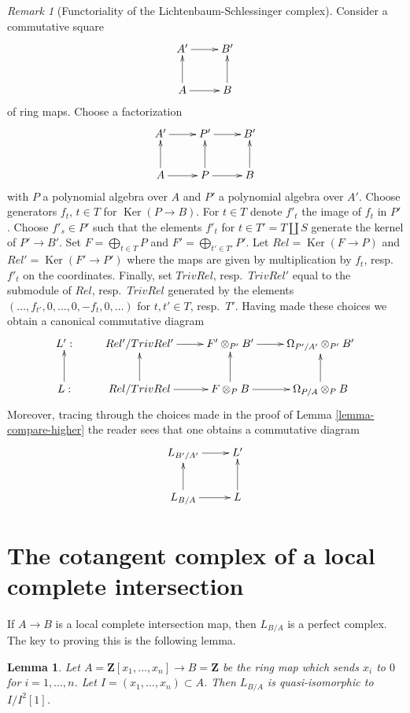 \documentclass{stacks-project}
\theoremstyle{plain}
\newtheorem{lemma}[subsection]{Lemma}
\theoremstyle{definition}
\theoremstyle{remark}
\newtheorem{remark}[subsection]{Remark}
\numberwithin{equation}{subsection}
\def\Ker{\mathop{\mathrm{Ker}}}
\begin{document}
\begin{remark}[Functoriality of the Lichtenbaum-Schlessinger complex]
\label{remark-functoriality-lichtenbaum-schlessinger}
Consider a commutative square
$$
\xymatrix{
A' \ar[r] & B' \\
A \ar[u] \ar[r] & B \ar[u]
}
$$
of ring maps. Choose a factorization
$$
\xymatrix{
A' \ar[r] & P' \ar[r] & B' \\
A \ar[u] \ar[r] & P \ar[u] \ar[r] & B \ar[u]
}
$$
with $P$ a polynomial algebra over $A$ and $P'$ a polynomial algebra over $A'$.
Choose generators $f_t$, $t \in T$ for $\Ker(P \to B)$.
For $t \in T$ denote $f'_t$ the image of $f_t$ in $P'$.
Choose $f'_s \in P'$ such that the elements $f'_t$ for
$t \in T' = T \amalg S$ generate the kernel
of $P' \to B'$. Set $F = \bigoplus_{t \in T} P$ and
$F' = \bigoplus_{t' \in T'} P'$. Let $Rel = \Ker(F \to P)$
and $Rel' = \Ker(F' \to P')$ where the maps are given
by multiplication by $f_t$, resp.\ $f'_t$ on the coordinates.
Finally, set $TrivRel$, resp.\ $TrivRel'$ equal to the submodule
of $Rel$, resp.\ $TrivRel$ generated by the elements
$(\ldots, f_{t'}, 0, \ldots, 0, -f_t, 0, \ldots)$
for $t, t' \in T$, resp.\ $T'$. Having made these choices we obtain a
canonical commutative diagram
$$
\xymatrix{
L' : &
Rel'/TrivRel' \ar[r] &
F' \otimes_{P'} B' \ar[r] &
\Omega_{P'/A'} \otimes_{P'} B' \\
L : \ar[u] &
Rel/TrivRel \ar[r] \ar[u] &
F \otimes_P B \ar[r] \ar[u] &
\Omega_{P/A} \otimes_P B \ar[u]
}
$$
Moreover, tracing through the choices made in the proof of
Lemma \ref{lemma-compare-higher}
the reader sees that one obtains a commutative diagram
$$
\xymatrix{
L_{B'/A'} \ar[r] & L' \\
L_{B/A} \ar[r] \ar[u] & L \ar[u]
}
$$
\end{remark}





\section{The cotangent complex of a local complete intersection}
\label{section-lci}

\noindent
If $A \to B$ is a local complete intersection map, then
$L_{B/A}$ is a perfect complex. The key to proving this is
the following lemma.

\begin{lemma}
\label{lemma-special-case}
Let $A = \mathbf{Z}[x_1, \ldots, x_n] \to B = \mathbf{Z}$
be the ring map which sends $x_i$ to $0$ for $i = 1, \ldots, n$.
Let $I = (x_1, \ldots, x_n) \subset A$. Then $L_{B/A}$ is quasi-isomorphic to
$I/I^2[1]$.
\end{lemma}
\end{document}
